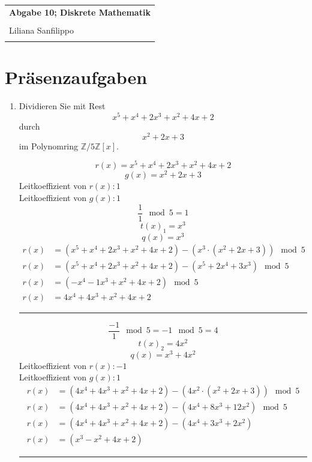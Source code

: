 \documentclass{article} %
\newcommand{\titulo}{Abgabe 10; Diskrete Mathematik}
\newcommand{\nombre}{Liliana Sanfilippo}
\begin{document}
\begin{tabular}{p{12cm}}
{{\Large\bf\titulo}}\\
\vspace{0.2cm}\\
 {\large\nombre}\\
 \vspace{0.1cm}
\end{tabular}

\section*{Präsenzaufgaben}
\begin{enumerate}
    \item Dividieren Sie mit Rest
    \[
    x^5 + x^4 + 2x^3 + x^2 + 4x + 2
    \]
    durch
    \[
    x^2 + 2x + 3
    \]
    im Polynomring \( \mathbb{Z}/5\mathbb{Z}[x] \).
    \begin{mybox}
    \[
    r(x) = x^5 + x^4 + 2x^3 + x^2 + 4x + 2
    \]
    \[
    g(x) = x^2 + 2x + 3
    \]
    Leitkoeffizient von $r(x): 1$ \\
    Leitkoeffizient von $g(x): 1$ \\
    \[
    \frac{1}{1} \mod 5 = 1 
    \]
     \[
    t(x)_1 = x^3
    \]
    \[
    q(x) = x^3
    \]
     \begin{align*}
        r(x) & = (x^5 + x^4 + 2x^3 + x^2 + 4x + 2) - (x^3 \cdot (x^2 + 2x + 3)) \mod 5 \\
        r(x) & = (x^5 + x^4 + 2x^3 + x^2 + 4x + 2) - (x^5 + 2x^4 + 3x^3) \mod 5 \\
        r(x) & = (-x^4 - 1x^3 + x^2 + 4x + 2) \mod 5 \\
        r(x) & = 4x^4 +4x^3 + x^2 + 4x + 2
    \end{align*}
    \hrule 
    \[
    \frac{-1}{1} \mod 5 = -1 \mod 5 = 4
    \]
    \[
    t(x)_2 = 4x^2
    \]
    \[
    q(x) = x^3 + 4x^2
    \]
     Leitkoeffizient von $r(x): -1$ \\
    Leitkoeffizient von $g(x): 1$ \\
    \begin{align*}
        r(x) & = (4x^4 +4x^3 + x^2 + 4x + 2) - (4x^2 \cdot (x^2 + 2x + 3)) \mod 5 \\
        r(x) & = (4x^4 +4x^3 + x^2 + 4x + 2) - (4x^4 + 8x^3 + 12x^2) \mod 5\\
        r(x) & = (4x^4 +4x^3 + x^2 + 4x + 2) - (4x^4 + 3x^3 + 2x^2) \\
        r(x) & = (x^3 - x^2 + 4x + 2)
    \end{align*}
    \hrule 
    \end{mybox}
    

\end{enumerate}
\end{document}
